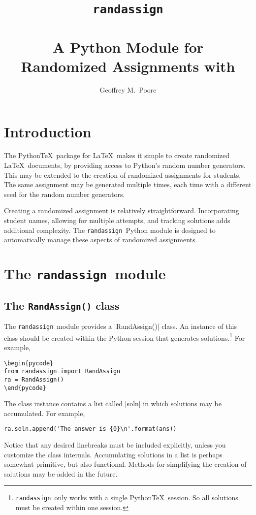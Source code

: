 \documentclass[11pt]{article}
\title{\texttt{randassign} \\~\\ A Python Module for \\ Randomized Assignments with \pytex}
\author{Geoffrey M.\ Poore}
\date{}
\newcommand{\pytex}{Python\TeX}
\newcommand{\ra}{\texttt{randassign}}
\begin{document}
\maketitle


\section{Introduction}

The \pytex\ package for \LaTeX\ makes it simple to create randomized \LaTeX\ documents, by providing access to Python's random number generators.  
This may be extended to the creation of randomized assignments for students.  The same assignment may be generated multiple times, each time with a different seed for the random number generators.

Creating a randomized assignment is relatively straightforward.  Incorporating student names, allowing for multiple attempts, and tracking solutions adds additional complexity.  The \ra\ Python module is designed to automatically manage these aspects of randomized assignments.


\section{The \ra\ module}

\subsection{The \texttt{RandAssign()} class}

The \ra\ module provides a |RandAssign()| class.  An instance of this class should be created within the Python session that generates solutions.\footnote{\ra\ only works with a single \pytex\ session.  So all solutions must be created within one session.}  For example,
\begin{Verbatim}
\begin{pycode}
from randassign import RandAssign
ra = RandAssign()
\end{pycode}
\end{Verbatim}

The class instance contains a list called |soln| in which solutions may be accumulated.  For example,
\begin{Verbatim}
ra.soln.append('The answer is {0}\n'.format(ans))
\end{Verbatim}
Notice that any desired linebreaks must be included explicitly, unless you customize the class internals.  Accumulating solutions in a list is perhaps somewhat primitive, but also functional.  Methods for simplifying the creation of solutions may be added in the future.
\end{document}
